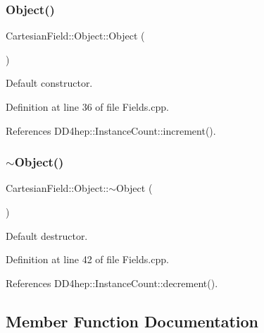 \subsubsection{\texorpdfstring{Object()}{Object()}}
{\footnotesize\ttfamily Cartesian\+Field\+::\+Object\+::\+Object (\begin{DoxyParamCaption}{ }\end{DoxyParamCaption})}



Default constructor. 



Definition at line 36 of file Fields.\+cpp.



References D\+D4hep\+::\+Instance\+Count\+::increment().

\hypertarget{class_d_d4hep_1_1_geometry_1_1_cartesian_field_1_1_object_a8bc1219e4d9ef209dd929f96c7dfd5b4}{}\label{class_d_d4hep_1_1_geometry_1_1_cartesian_field_1_1_object_a8bc1219e4d9ef209dd929f96c7dfd5b4} 
\subsubsection{\texorpdfstring{$\sim$\+Object()}{~Object()}}
{\footnotesize\ttfamily Cartesian\+Field\+::\+Object\+::$\sim$\+Object (\begin{DoxyParamCaption}{ }\end{DoxyParamCaption})\hspace{0.3cm}{\ttfamily [virtual]}}



Default destructor. 



Definition at line 42 of file Fields.\+cpp.



References D\+D4hep\+::\+Instance\+Count\+::decrement().



\subsection{Member Function Documentation}
\hypertarget{class_d_d4hep_1_1_geometry_1_1_cartesian_field_1_1_object_ab3fa7f39545c8b0f769ee1ddfd03ed90}{}\label{class_d_d4hep_1_1_geometry_1_1_cartesian_field_1_1_object_ab3fa7f39545c8b0f769ee1ddfd03ed90} 
